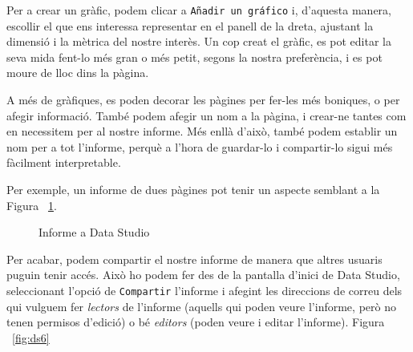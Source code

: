 \documentclass[11pt,longbibliography]{article}
\theoremstyle{definition}
\theoremstyle{remark}
\begin{document}
Per a crear un gràfic, podem clicar a \verb|Añadir un gráfico| i, d'aquesta manera, escollir el que ens interessa representar en el panell de la dreta, ajustant la dimensió i la mètrica del nostre interès. Un cop creat el gràfic, es pot editar la seva mida fent-lo més gran o més petit, segons la nostra preferència, i es pot moure de lloc dins la pàgina.

A més de gràfiques, es poden decorar les pàgines per fer-les més boniques, o per afegir informació. També podem afegir un nom a la pàgina, i crear-ne tantes com en necessitem per al nostre informe. Més enllà d'això, també podem establir un nom per a tot l'informe, perquè a l'hora de guardar-lo i compartir-lo sigui més fàcilment interpretable.

Per exemple, un informe de dues pàgines pot tenir un aspecte semblant a la Figura ~\ref{fig:ds4}.

\begin{figure}[h!]
\par
{}%
\hfill
{}%
\par

\caption{Informe a Data Studio}
\label{fig:ds4}
\end{figure}

\newpage

Per acabar, podem compartir el nostre informe de manera que altres usuaris puguin tenir accés. Això ho podem fer des de la pantalla d'inici de Data Studio, seleccionant l'opció de \verb|Compartir| l'informe i afegint les direccions de correu dels qui vulguem fer \textit{lectors} de l'informe (aquells qui poden veure l'informe, però no tenen permisos d'edició) o bé \textit{editors} (poden veure i editar l'informe). Figura ~\ref{fig:ds6}
\end{document}
